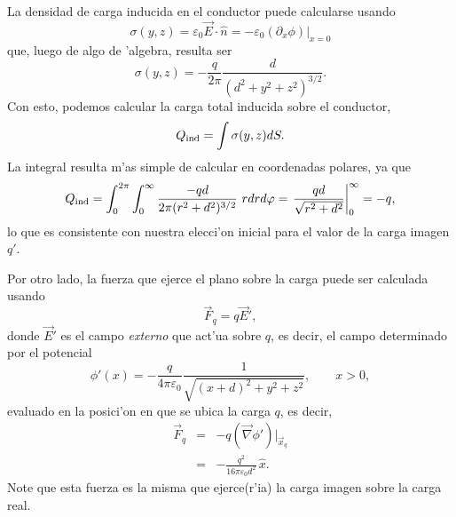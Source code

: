 La densidad de carga inducida en el conductor puede calcularse usando
\begin{equation}
 \sigma(y,z)=\varepsilon_0
\vec{E}\cdot\hat{n}=-\varepsilon_0\left.(\partial_x\phi)\right|_{x=0}
\end{equation}
que, luego de algo de 'algebra, resulta ser
\begin{equation}
 \sigma(y,z)=-\frac{q}{2\pi}\frac{d}{(d^2+y^2+z^2)^{3/2}}.
\end{equation}
Con esto, podemos calcular la carga total inducida sobre el conductor,
\begin{equation}
Q_{\rm ind} = \int \sigma(y,z) dS.
\end{equation}
La integral resulta m'as simple de calcular en coordenadas polares, ya que
\begin{equation}
Q_{\rm ind} = \int_0^{2\pi} \int_0^\infty \dfrac{-qd}{2\pi (r^2 + d^2)^{3/2}} \ r  dr  d\varphi = \left. \dfrac{qd}{\sqrt{r^2 + d^2}} \right|_{0}^{\infty} = -q,
\end{equation}
lo que es consistente con nuestra elecci'on inicial para el valor de la carga imagen $q'$.

Por otro lado, la fuerza que ejerce el plano sobre la carga puede ser calculada usando
\begin{equation}
\vec{F}_q=q\vec{E}',
\end{equation}
donde $\vec{E}'$ es el campo \textit{externo} que act'ua sobre $q$, es decir, el campo
determinado por el potencial
\begin{equation}
 \phi'(x)=-\frac{q}{4\pi\varepsilon_0}\frac{1}{\sqrt{(x+d)^2+y^2+z^2}},
\qquad x>0,
\end{equation}
evaluado en la posici'on en que se ubica la carga $q$, es decir,
\begin{eqnarray}
 \vec{F}_q&=&-q(\vec{\nabla}\phi')|_{\vec{x}_q} \\
&=&-\frac{q^2}{16\pi\varepsilon_0d^2}\,\hat{x}.
\end{eqnarray}
Note que esta fuerza es la misma que ejerce(r'ia) la carga imagen sobre la carga real.

